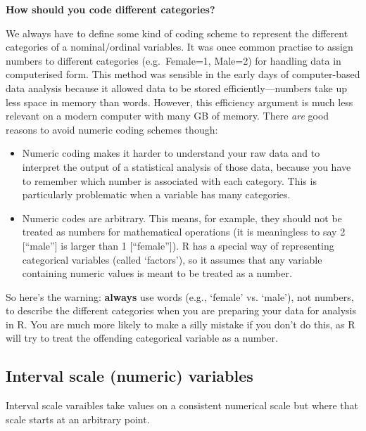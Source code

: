 \documentclass[]{book}
\begin{document}
\begin{warning-box}
\textbf{How should you code different categories?}

We always have to define some kind of coding scheme to represent the
different categories of a nominal/ordinal variables. It was once common
practise to assign numbers to different categories (e.g.~Female=1,
Male=2) for handling data in computerised form. This method was sensible
in the early days of computer-based data analysis because it allowed
data to be stored efficiently---numbers take up less space in memory
than words. However, this efficiency argument is much less relevant on a
modern computer with many GB of memory. There \emph{are} good reasons to
avoid numeric coding schemes though:

\begin{itemize}
\item
  Numeric coding makes it harder to understand your raw data and to
  interpret the output of a statistical analysis of those data, because
  you have to remember which number is associated with each category.
  This is particularly problematic when a variable has many categories.
\item
  Numeric codes are arbitrary. This means, for example, they should not
  be treated as numbers for mathematical operations (it is meaningless
  to say 2 {[}``male''{]} is larger than 1 {[}``female''{]}). R has a
  special way of representing categorical variables (called `factors'),
  so it assumes that any variable containing numeric values is meant to
  be treated as a number.
\end{itemize}

So here's the warning: \textbf{always} use words (e.g., `female' vs.
`male'), not numbers, to describe the different categories when you are
preparing your data for analysis in R. You are much more likely to make
a silly mistake if you don't do this, as R will try to treat the
offending categorical variable as a number.
\end{warning-box}

\subsection{Interval scale (numeric)
variables}\label{interval-scale-numeric-variables}

Interval scale varaibles take values on a consistent numerical scale but
where that scale starts at an arbitrary point.
\end{document}
